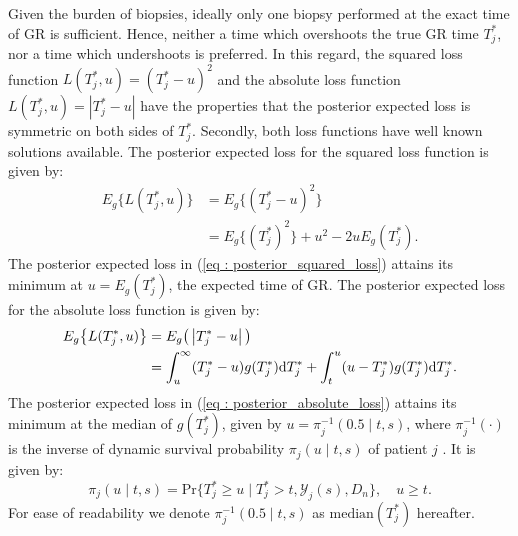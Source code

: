 Given the burden of biopsies, ideally only one biopsy performed at the exact time of GR is sufficient. Hence, neither a time which overshoots the true GR time $T^*_j$, nor a time which undershoots is preferred. In this regard, the squared loss function $L(T^*_j, u) = (T^*_j - u)^2$ and the absolute loss function $L(T^*_j, u) = \left|{T^*_j - u}\right|$ have the properties that the posterior expected loss is symmetric on both sides of $T^*_j$. Secondly, both loss functions have well known solutions available. The posterior expected loss for the squared loss function is given by:
\begin{equation}
\label{eq : posterior_squared_loss}
\begin{split}
E_g\big\{L(T^*_j, u)\big\} &= E_g\big\{(T^*_j - u)^2\big\}\\
&=E_g\big\{(T^*_j)^2\big\} + u^2 -2uE_g(T^*_j).
\end{split}
\end{equation}
The posterior expected loss in (\ref{eq : posterior_squared_loss}) attains its minimum at $u = E_g(T^*_j)$, the expected time of GR. The posterior expected loss for the absolute loss function is given by:
\begin{equation}
\label{eq : posterior_absolute_loss}
\begin{split}
E_g\big\{L(T^*_j, u)\big\} &= E_g\big(\left|{T^*_j - u}\right|\big)\\
&= \int_u^\infty (T^*_j - u) g(T^*_j)\rmn{d} T^*_j + \int_t^u (u - T^*_j) g(T^*_j)\rmn{d} T^*_j.
\end{split}
\end{equation}
The posterior expected loss in (\ref{eq : posterior_absolute_loss}) attains its minimum at the median of $g(T^*_j)$, given by $u = \pi_j^{-1}(0.5 \mid t,s)$, where $\pi_j^{-1}(\cdot)$ is the inverse of dynamic survival probability $\pi_j(u \mid t, s)$ of patient $j$ \citep{rizopoulos2011dynamic}. It is given by:
\begin{equation*}
\label{eq : dynamic_surv_prob}
\pi_j(u \mid t, s) = \mbox{Pr}\big\{T^*_j \geq u \mid  T^*_j >t, \mathcal{Y}_j(s), D_n\big\}, \quad u \geq t.
\end{equation*}
For ease of readability we denote $\pi_j^{-1}(0.5 \mid t,s)$ as $\mbox{median}(T^*_j)$ hereafter.

